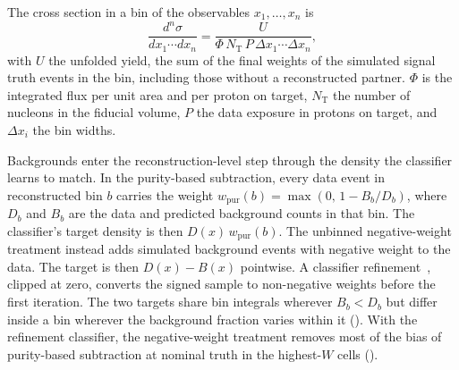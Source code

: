 The cross section in a bin of the observables $x_1,\dots,x_n$ is
\begin{equation}
\frac{d^{n}\sigma}{dx_{1}\cdots dx_{n}}=\frac{U}{\Phi\,N_{\mathrm{T}}\,P\,\Delta x_{1}\cdots\Delta x_{n}},
\label{eq:xsec}
\end{equation}
with $U$ the unfolded yield, the sum of the final weights of the simulated signal truth events in the bin, including those without a reconstructed partner. $\Phi$ is the integrated flux per unit area and per proton on target, $N_{\mathrm{T}}$ the number of nucleons in the fiducial volume, $P$ the data exposure in protons on target, and $\Delta x_i$ the bin widths.

Backgrounds enter the reconstruction-level step through the density the classifier learns to match. In the purity-based subtraction, every data event in reconstructed bin $b$ carries the weight $w_{\mathrm{pur}}(b)=\max(0,\,1-B_{b}/D_{b})$, where $D_{b}$ and $B_{b}$ are the data and predicted background counts in that bin. The classifier's target density is then $D(x)\,w_{\mathrm{pur}}(b)$. The unbinned negative-weight treatment instead adds simulated background events with negative weight to the data. The target is then $D(x)-B(x)$ pointwise. A classifier refinement~\cite{StayPositive2025}, clipped at zero, converts the signed sample to non-negative weights before the first iteration. The two targets share bin integrals wherever $B_{b}<D_{b}$ but differ inside a bin wherever the background fraction varies within it (). With the refinement classifier, the negative-weight treatment removes most of the bias of purity-based subtraction at nominal truth in the highest-$W$ cells ().

